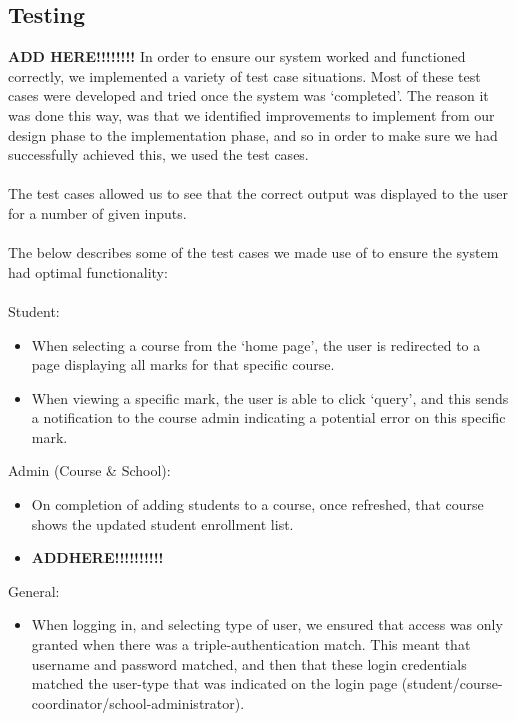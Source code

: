 \documentclass[paper=a4, fontsize=11pt]{scrartcl}
\numberwithin{equation}{section}		%
\numberwithin{figure}{section}			%
\numberwithin{table}{section}				%
\begin{document}
\subsection{Testing}
\huge\textbf{ADD HERE!!!!!!!!}\normalsize
In  order to ensure our system worked and functioned correctly, we implemented a variety of test case situations. Most of these test cases were developed and tried once the system was ‘completed’. The reason it was done this way, was that we identified improvements to implement from our design phase to the implementation phase, and so in order to make sure we had successfully achieved this, we used the test cases.\\\\The test cases allowed us to see that the correct output was displayed to the user for a number of given inputs.\\\\The below describes some of the test cases we made use of to ensure the system had optimal functionality:\\\\Student:
\begin{itemize}
\item When selecting a course from the ‘home page’, the user is redirected to a page displaying all marks for that specific course. 
\item When viewing a specific mark, the user is able to click ‘query’, and this sends a notification to the course admin indicating a potential error on this specific mark.
\end{itemize}
Admin (Course \& School):
\begin{itemize}
\item On completion of adding students to a course, once refreshed, that course shows the updated student enrollment list.
\item \huge\textbf{ADDHERE!!!!!!!!!!}\normalsize
\end{itemize}
General:
\begin{itemize}
\item When logging in, and selecting type of user, we ensured that access was only granted when there was a triple-authentication match. This meant that username and password matched, and then that these login credentials matched the user-type that was indicated on the login page (student/course-coordinator/school-administrator).   
\end{itemize}



   
\end{document}

